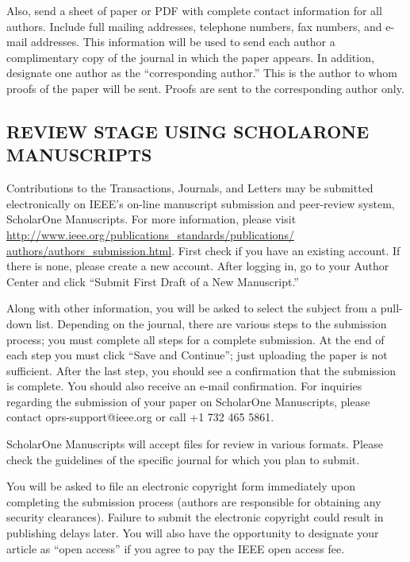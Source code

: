 \documentclass{ieeeojpel}
\begin{document}
Also, send a sheet of paper or PDF with complete contact information for all 
authors. Include full mailing addresses, telephone numbers, fax numbers, and 
e-mail addresses. This information will be used to send each author a 
complimentary copy of the journal in which the paper appears. In addition, 
designate one author as the ``corresponding author.'' This is the author to 
whom proofs of the paper will be sent. Proofs are sent to the corresponding 
author only.

\subsection{REVIEW STAGE USING SCHOLARONE{\textregistered} MANUSCRIPTS}
Contributions to the Transactions, Journals, and Letters may be submitted 
electronically on IEEE's on-line manuscript submission and peer-review 
system, ScholarOne{\textregistered} Manuscripts. For more information, please visit \underline{http://www.ieee.org/publications\_standards/publications/}\break
\underline{authors/authors\_submission.html}.
 First 
check if you have an existing account. If there is none, please create a new 
account. After logging in, go to your Author Center and click ``Submit First 
Draft of a New Manuscript.'' 

Along with other information, you will be asked to select the subject from a 
pull-down list. Depending on the journal, there are various steps to the 
submission process; you must complete all steps for a complete submission. 
At the end of each step you must click ``Save and Continue''; just uploading 
the paper is not sufficient. After the last step, you should see a 
confirmation that the submission is complete. You should also receive an 
e-mail confirmation. For inquiries regarding the submission of your paper on 
ScholarOne Manuscripts, please contact oprs-support@ieee.org or call +1 
732 465 5861.

ScholarOne Manuscripts will accept files for review in various formats. 
Please check the guidelines of the specific journal for which you plan to 
submit. 

You will be asked to file an electronic copyright form immediately upon 
completing the submission process (authors are responsible for obtaining any 
security clearances). Failure to submit the electronic copyright could 
result in publishing delays later. You will also have the opportunity to 
designate your article as ``open access'' if you agree to pay the IEEE open 
access fee. 
\end{document}
